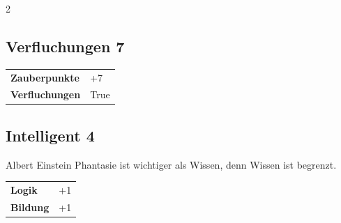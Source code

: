 \begin{multicols}{2}
\begin{tcolorbox}
\vspace{3mm}



\end{tcolorbox}

\begin{tcolorbox}
    \subsection*{Verfluchungen \hfill \small{7 }}
    \tcblower




\begin{tabular}{@{}ll@{}}
    \textbf{Zauberpunkte} & +7\\
    \textbf{Verfluchungen} & True\\
\end{tabular}


\end{tcolorbox}

\begin{tcolorbox}
    \subsection*{Intelligent \hfill \small{4 }}
    \tcblower


\begin{pquote}{Albert Einstein}
Phantasie ist wichtiger als Wissen, denn Wissen ist begrenzt.
\end{pquote}

\vspace{3mm}

\begin{tabular}{@{}ll@{}}
    \textbf{Logik} & +1\\
    \textbf{Bildung} & +1\\
\end{tabular}


\end{tcolorbox}


\end{multicols}
